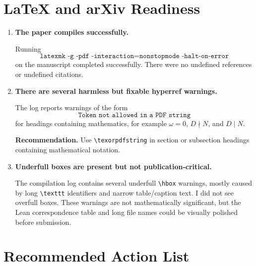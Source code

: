 \documentclass[11pt]{article}
\begin{document}
\section*{LaTeX and arXiv Readiness}

\begin{enumerate}[label=\textbf{A\arabic*.},leftmargin=*]

\item \textbf{The paper compiles successfully.}

Running
\[
\texttt{latexmk -g -pdf -interaction=nonstopmode -halt-on-error}
\]
on the manuscript completed successfully.  There were no undefined
references or undefined citations.

\item \textbf{There are several harmless but fixable hyperref warnings.}

The log reports warnings of the form
\[
\texttt{Token not allowed in a PDF string}
\]
for headings containing mathematics, for example
\(\omega=0\), \(D\nmid N\), and \(D\mid N\).

\textbf{Recommendation.}  Use \verb|\texorpdfstring| in
section or subsection headings containing mathematical notation.

\item \textbf{Underfull boxes are present but not publication-critical.}

The compilation log contains several underfull \verb|\hbox|
warnings, mostly caused by long \verb|\texttt| identifiers
and narrow table/caption text.  I did not see overfull boxes.  These warnings
are not mathematically significant, but the Lean correspondence table and
long file names could be visually polished before submission.

\end{enumerate}

\section*{Recommended Action List}
\end{document}
